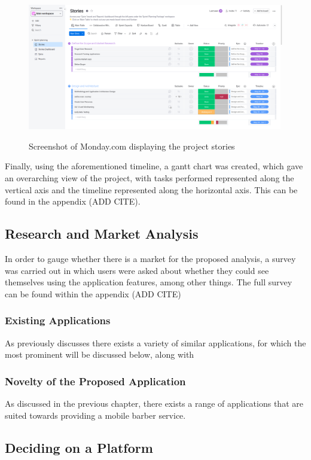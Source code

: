 \documentclass[12pt]{article}
\begin{document}
	\begin{figure}[H]
		\centering
		\includegraphics[scale=0.25]{images/monday.png}
		\caption{Screenshot of Monday.com displaying the project stories}
		\label{fig:monday.com}
		\cite{monday.com}
	\end{figure}

	Finally, using the aforementioned timeline, a gantt chart was created, which gave an overarching view of the project, with tasks performed represented along the vertical axis and the timeline represented along the horizontal axis. This can be found in the appendix (ADD CITE).
	
	\subsection{Research and Market Analysis}
	In order to gauge whether there is a market for the proposed analysis, a survey was carried out in which users were asked about whether they could see themselves using the application features, among other things. The full survey can be found within the appendix (ADD CITE)
	
	\subsubsection{Existing Applications}
	As previously discusses there exists a variety of similar applications, for which the most prominent will be discussed below, along with
	
	\subsubsection{Novelty of the Proposed Application}
	As discussed in the previous chapter, there exists a range of applications that are suited towards providing a mobile barber service. 
	
	\subsection{Deciding on a Platform}
\end{document}
